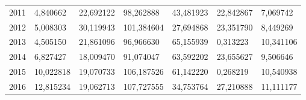 \begin{table}
\begin{tabular}{p{1cm}p{2cm}p{2cm}p{2cm}p{2cm}p{2cm}p{2cm}}
 2011 &                 4,840662 &                      22,692122 &                    98,262888 &  43,481923 &                                 22,842867 &  7,069742 \\
 2012 &                 5,008303 &                      30,119943 &                   101,384604 &  27,694868 &                                 23,351790 &  8,449269 \\
 2013 &                 4,505150 &                      21,861096 &                    96,966630 &  65,155939 &                                  0,313223 & 10,341106 \\
 2014 &                 6,827427 &                      18,009470 &                    91,074047 &  63,592202 &                                 23,655627 &  9,506646 \\
 2015 &                10,022818 &                      19,070733 &                   106,187526 &  61,142220 &                                  0,268219 & 10,540938 \\
 2016 &                12,815234 &                      19,062713 &                   107,727555 &  34,753764 &                                 27,210888 & 11,111177 \\
\bottomrule
\end{tabular}
\end{table}
